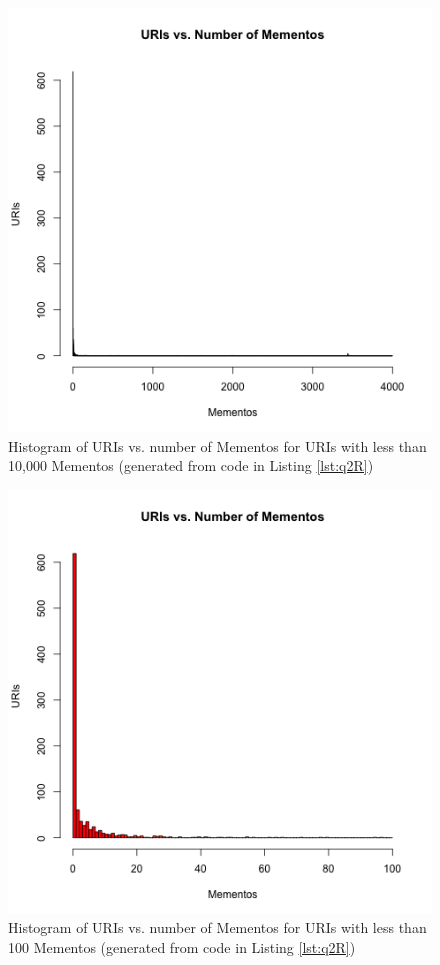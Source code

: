 \documentclass[letterpaper,11pt]{article}
\begin{document}
\begin{figure}
\includegraphics[scale=0.7]{work/q2/q2-histogram2.png}
\caption{Histogram of URIs vs. number of Mementos for URIs with less than 10,000 Mementos (generated from code in Listing \ref{lst:q2R})}
\label{fig:q2histy2}
\end{figure}

\begin{figure}
\includegraphics[scale=0.7]{work/q2/q2-histogram3.png}
\caption{Histogram of URIs vs. number of Mementos for URIs with less than 100 Mementos (generated from code in Listing \ref{lst:q2R})}
\label{fig:q2histy3}
\end{figure}
\end{document}

